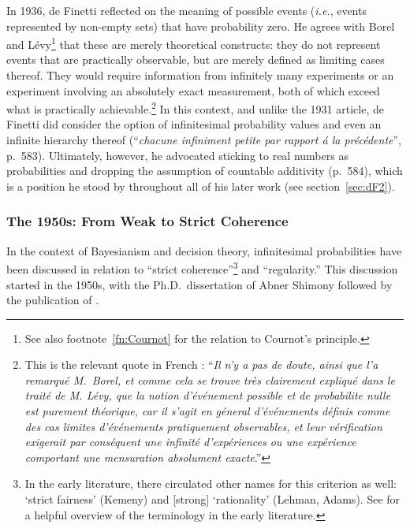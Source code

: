 In 1936, de Finetti reflected on the meaning of possible events (\textit{i.e.}, events represented by non-empty sets) that have probability zero. He agrees with Borel and L{\'{e}}vy\footnote{See also footnote~\ref{fn:Cournot} for the relation to Cournot's principle.} that these are merely theoretical constructs: they do not represent events that are practically observable, but are merely defined as limiting cases thereof. They would require information from infinitely many experiments or an experiment involving an absolutely exact measurement, both of which exceed what is practically achievable.\footnote{This is the relevant quote in French \citep[p.~577]{deFinetti:1936}: ``\textit{Il n'y a pas de doute, ainsi que l'a remarqu\'{e} M.\ Borel, et comme cela se trouve tr\`{e}s clairement expliqu\'{e} dans le trait\'{e} de M. L\'{e}vy, que la notion d'\'{e}v\'{e}nement possible et de probabilite nulle est purement th\'{e}orique, car il s'agit en g\'{e}neral d'\'{e}v\'{e}nements d\'{e}finis comme des cas limites d'\'{e}v\'{e}nements pratiquement observables, et leur v\'{e}rification exigerait par cons\'{e}quent une \emph{infinit\'{e}} d'exp\'{e}riences ou une exp\'{e}rience comportant une mensuration absolument \emph{exacte}}.''}
In this context, and unlike the 1931 article, de Finetti did consider the option of infinitesimal probability values and even an infinite hierarchy thereof (``\textit{chacune infiniment petite par rapport \'{a} la pr\'{e}c\'{e}dente}'', p.~583). Ultimately, however, he advocated sticking to real numbers as probabilities and dropping the assumption of countable additivity (p.~584), which is a position he stood by throughout all of his later work (see section~\ref{sec:dF2}).

\subsubsection*{The 1950s: From Weak to Strict Coherence}\label{sec:coherence}
In the context of Bayesianism and decision theory, infinitesimal probabilities have been discussed in relation to ``strict coherence''\footnote{In the early literature, there circulated other names for this criterion as well: `strict fairness' (Kemeny) and [strong] `rationality' (Lehman, Adams). See \citet[p.~114]{Carnap:1971b} for a helpful overview of the terminology in the early literature.} and ``regularity.'' This discussion started in the 1950s, with the Ph.D.\ dissertation of Abner Shimony followed by the publication of \citet{Shimony:1955}.

